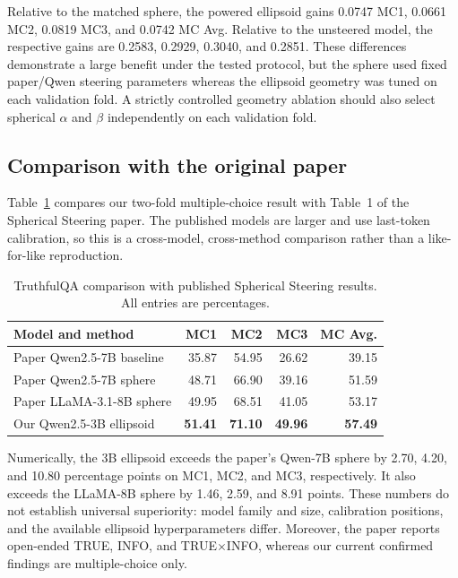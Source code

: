 \documentclass[11pt]{article}
\begin{document}
Relative to the matched sphere, the powered ellipsoid gains 0.0747 MC1,
0.0661 MC2, 0.0819 MC3, and 0.0742 MC Avg. Relative to the unsteered model,
the respective gains are 0.2583, 0.2929, 0.3040, and 0.2851. These differences
demonstrate a large benefit under the tested protocol, but the sphere used
fixed paper/Qwen steering parameters whereas the ellipsoid geometry was tuned
on each validation fold. A strictly controlled geometry ablation should also
select spherical $\alpha$ and $\beta$ independently on each validation fold.

\subsection{Comparison with the original paper}

Table~\ref{tab:paper-comparison} compares our two-fold multiple-choice result
with Table~1 of the Spherical Steering paper. The published models are larger
and use last-token calibration, so this is a cross-model, cross-method
comparison rather than a like-for-like reproduction.

\begin{table}[ht]
\centering
\caption{TruthfulQA comparison with published Spherical Steering results.
All entries are percentages.}
\label{tab:paper-comparison}
\begin{tabular}{lrrrr}
\toprule
Model and method & MC1 & MC2 & MC3 & MC Avg.\\
\midrule
Paper Qwen2.5-7B baseline & 35.87 & 54.95 & 26.62 & 39.15\\
Paper Qwen2.5-7B sphere & 48.71 & 66.90 & 39.16 & 51.59\\
Paper LLaMA-3.1-8B sphere & 49.95 & 68.51 & 41.05 & 53.17\\
Our Qwen2.5-3B ellipsoid & \textbf{51.41} & \textbf{71.10} &
\textbf{49.96} & \textbf{57.49}\\
\bottomrule
\end{tabular}
\end{table}

Numerically, the 3B ellipsoid exceeds the paper's Qwen-7B sphere by 2.70,
4.20, and 10.80 percentage points on MC1, MC2, and MC3, respectively. It also
exceeds the LLaMA-8B sphere by 1.46, 2.59, and 8.91 points. These numbers do
not establish universal superiority: model family and size, calibration
positions, and the available ellipsoid hyperparameters differ. Moreover, the
paper reports open-ended TRUE, INFO, and TRUE$\times$INFO, whereas our current
confirmed findings are multiple-choice only.
\end{document}

